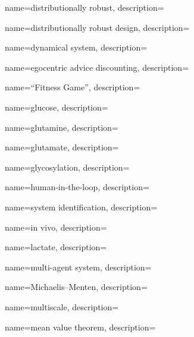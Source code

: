 	{
		name={distributionally robust},
		description={}
	}
	
	{
		name={distributionally robust design},
		description={}
	}
	
	{
		name={dynamical system},
		description={}
	}		


	{
		name={egocentric advice discounting},
		description={}
	}


	{
		name={``Fitness Game''},
		description={}
	}


	{
		name={glucose},
		description={}
	}
	
	{
		name={glutamine},
		description={}
	}	
	
	{
		name={glutamate},
		description={}
	}		


	{
		name={glycosylation},
		description={}
	}	


	{
		name={human-in-the-loop},
		description={}
	}
	

	{
		name={system identification},
		description={}
	}

	{
		name={in vivo},		
		description={}
	}
	

	{
		name={lactate},
		description={}
	}	
	

	{
		name={multi-agent system},
		description={}
	}	



	{
		name={Michaelis--Menten},
		description={}
	}		


	{
		name={multiscale},
		description={}
	}		


	{
		name={mean value theorem},
		description={}
	}		
	

